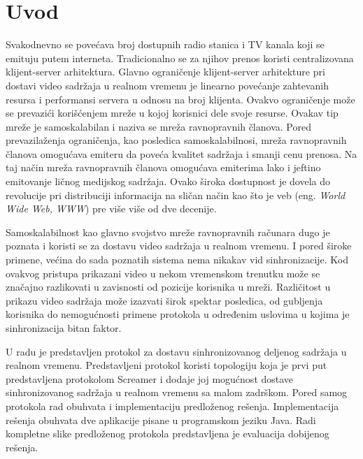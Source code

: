 \documentclass[12pt,oneside]{memoir}
\begin{document}
\frontmatter
\naslovna
\komisija
\apstrakt
\tableofcontents*

\mainmatter

\chapter{Uvod}
Svakodnevno se povećava broj dostupnih radio stanica i TV kanala koji se emituju putem interneta. Tradicionalno se za njihov prenos koristi centralizovana klijent-server arhitektura. Glavno ograničenje klijent-server arhitekture pri dostavi video sadržaja u realnom vremenu je linearno povećanje zahtevanih resursa i performansi servera u odnosu na broj klijenta. Ovakvo ograničenje može se prevazići korišćenjem mreže u kojoj korisnici dele svoje resurse. Ovakav tip mreže je samoskalabilan i naziva se mreža ravnopravnih članova. Pored prevazilaženja ograničenja, kao posledica samoskalabilnosi, mreža ravnopravnih članova omogućava emiteru da poveća kvalitet sadržaja i smanji cenu prenosa. Na taj način mreža ravnopravnih članova omogućava emiterima lako i jeftino emitovanje ličnog medijskog sadržaja. Ovako široka dostupnost je dovela do revolucije pri distribuciji informacija na sličan način kao što je veb (eng. \textit{World Wide Web, WWW}) pre više više od dve decenije.

Samoskalabilnost kao glavno svojstvo mreže ravnopravnih računara dugo je poznata i koristi se za dostavu video sadržaja u realnom vremenu. I pored široke primene, većina do sada poznatih sistema nema nikakav vid sinhronizacije. Kod ovakvog pristupa prikazani video u nekom vremenskom trenutku može se značajno razlikovati u zavisnosti od pozicije korisnika u mreži. Različitost u prikazu video sadržaja može izazvati širok spektar posledica, od gubljenja korisnika do nemogućnosti primene protokola u određenim uslovima u kojima je sinhronizacija bitan faktor.

U radu je predstavljen protokol za dostavu sinhronizovanog deljenog sadržaja u realnom vremenu. Predstavljeni protokol koristi topologiju koja je prvi put predstavljena protokolom  Screamer i dodaje joj mogućnost dostave sinhronizovanog sadržaja u realnom vremenu sa malom zadrškom. Pored samog protokola rad obuhvata i implementaciju predloženog rešenja. Implementacija rešenja obuhvata dve aplikacije pisane u programskom jeziku Java. Radi kompletne slike predloženog protokola predstavljena je evaluacija dobijenog rešenja. 
  
\end{document}

